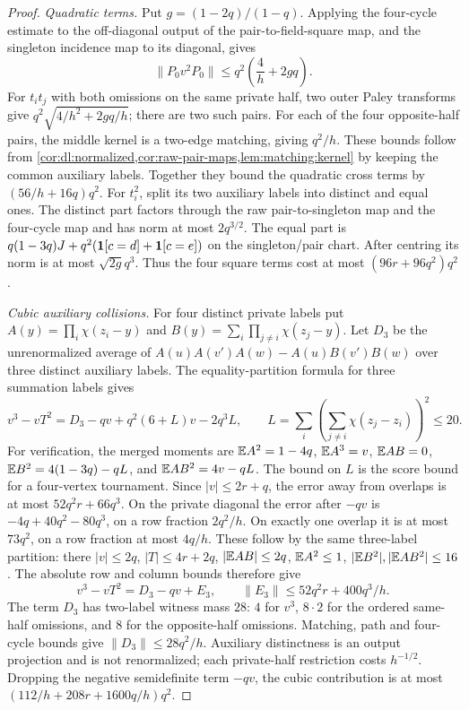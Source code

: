 \begin{proof}
\emph{Quadratic terms.}
Put $g=(1-2q)/(1-q)$. Applying the four-cycle estimate to the
off-diagonal output of the pair-to-field-square map, and the singleton
incidence map to its diagonal, gives
\[
 \|P_0v^2P_0\|\le q^2\left(\frac4h+2gq\right).
\]
For $t_it_j$ with both omissions on the same private half, two outer
Paley transforms give
$q^2\sqrt{4/h^2+2gq/h}$; there are two such pairs.
For each of the four opposite-half pairs, the middle kernel is a
two-edge matching, giving $q^2/h$. These bounds follow from
\cref{cor:dl:normalized,cor:raw-pair-maps,lem:matching:kernel}
by keeping the common auxiliary labels. Together they bound the
quadratic cross terms by $(56/h+16q)q^2$.
For $t_i^2$, split its two auxiliary labels into distinct and equal
ones. The distinct part factors through the raw pair-to-singleton
map and the four-cycle map and has norm at most $2q^{3/2}$.
The equal part is
$q(1-3q)J+q^2(\mathbf 1[c=d]+\mathbf 1[c=e])$ on the singleton/pair chart.
After centring its norm is at most $\sqrt{2g}q^3$. Thus the four
square terms cost at most $(96r+96q^2)q^2$.

\emph{Cubic auxiliary collisions.}
For four distinct private labels put
$A(y)=\prod_i\chi(z_i-y)$ and
$B(y)=\sum_i\prod_{j\ne i}\chi(z_j-y)$.
Let $D_3$ be the unrenormalized average of
$A(u)A(v')A(w)-A(u)B(v')B(w)$ over three distinct auxiliary labels.
The equality-partition formula for three summation labels gives
\[
 v^3-vT^2=D_3-qv+q^2(6+L)v-2q^3L,
 \qquad L=\sum_i\left(\sum_{j\ne i}\chi(z_j-z_i)\right)^2\le20.
\]
For verification, the merged moments are
$\mathbb E A^2=1-4q$, $\mathbb E A^3=v$, $\mathbb E AB=0$,
$\mathbb E B^2=4(1-3q)-qL$, and $\mathbb E AB^2=4v-qL$.
The bound on $L$ is the score bound for a four-vertex tournament.
Since $|v|\le2r+q$, the error away from overlaps is at most
$52q^2r+66q^3$.
On the private diagonal the error after $-qv$ is
$-4q+40q^2-80q^3$, on a row fraction $2q^2/h$.
On exactly one overlap it is at most $73q^2$, on a row fraction
at most $4q/h$. These follow by the same three-label partition:
there $|v|\le2q$, $|T|\le4r+2q$, $|\mathbb E AB|\le2q$,
$\mathbb E A^2\le1$, $|\mathbb E B^2|,|\mathbb E AB^2|\le16$.
The absolute row and column bounds therefore give
\[
 v^3-vT^2=D_3-qv+E_3,\qquad
 \|E_3\|\le52q^2r+400q^3/h.
\]
The term $D_3$ has two-label witness mass $28$: $4$ for $v^3$,
$8\cdot2$ for the ordered same-half omissions, and $8$ for the
opposite-half omissions. Matching, path and four-cycle bounds give
$\|D_3\|\le28q^2/h$. Auxiliary distinctness is an output
projection and is not renormalized; each private-half restriction
costs $h^{-1/2}$. Dropping the negative semidefinite term $-qv$, the cubic
contribution is at most $(112/h+208r+1600q/h)q^2$.


\end{proof}
